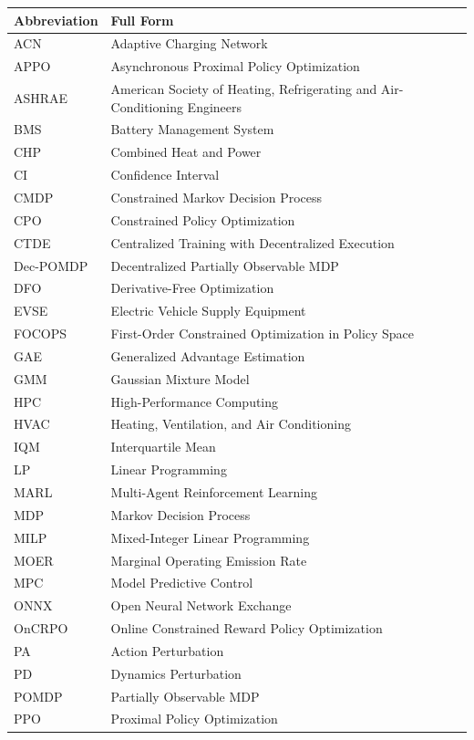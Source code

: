 \documentclass[12pt, letterpaper]{report}
\begin{document}
\begin{tabular}{@{}ll@{}}
\toprule
\textbf{Abbreviation} & \textbf{Full Form} \\
\midrule
ACN & Adaptive Charging Network \\
APPO & Asynchronous Proximal Policy Optimization \\
ASHRAE & American Society of Heating, Refrigerating and Air-Conditioning Engineers \\
BMS & Battery Management System \\
CHP & Combined Heat and Power \\
CI & Confidence Interval \\
CMDP & Constrained Markov Decision Process \\
CPO & Constrained Policy Optimization \\
CTDE & Centralized Training with Decentralized Execution \\
Dec-POMDP & Decentralized Partially Observable MDP \\
DFO & Derivative-Free Optimization \\
EVSE & Electric Vehicle Supply Equipment \\
FOCOPS & First-Order Constrained Optimization in Policy Space \\
GAE & Generalized Advantage Estimation \\
GMM & Gaussian Mixture Model \\
HPC & High-Performance Computing \\
HVAC & Heating, Ventilation, and Air Conditioning \\
IQM & Interquartile Mean \\
LP & Linear Programming \\
MARL & Multi-Agent Reinforcement Learning \\
MDP & Markov Decision Process \\
MILP & Mixed-Integer Linear Programming \\
MOER & Marginal Operating Emission Rate \\
MPC & Model Predictive Control \\
ONNX & Open Neural Network Exchange \\
OnCRPO & Online Constrained Reward Policy Optimization \\
PA & Action Perturbation \\
PD & Dynamics Perturbation \\
POMDP & Partially Observable MDP \\
PPO & Proximal Policy Optimization \\

\end{tabular}
\end{document}

